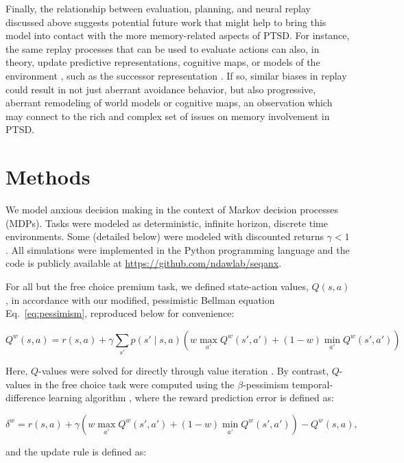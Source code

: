 \documentclass[11pt]{article} %
\begin{document}
Finally, the relationship between evaluation, planning, and neural replay discussed above suggests potential future work that might help to bring this model into contact with the more memory-related aspects of PTSD. For instance, the same replay processes that can be used to evaluate actions can also, in theory, update predictive representations, cognitive maps, or models of the environment \citep{russek_predictive_2017}, such as the successor representation \cite{dayan1993, momennejad_successor_2017}. If so, similar biases in replay could result in not just aberrant avoidance behavior, but also progressive, aberrant remodeling of world models or cognitive maps, an observation which may connect to the rich and complex set of issues on memory involvement in PTSD.

\section{Methods}

We model anxious decision making in the context of Markov decision processes (MDPs). Tasks were modeled as deterministic, infinite horizon, discrete time environments. Some (detailed below) were modeled with discounted returns $\gamma < 1$. All simulations were implemented in the Python programming language and the code is publicly available at \url{https://github.com/ndawlab/seqanx}.

For all but the free choice premium task, we defined state-action values, $Q(s,a)$, in accordance with our modified, pessimistic Bellman equation Eq.~\ref{eq:pessimism}, reproduced below for convenience:

\begin{equation*}
Q^w(s,a) = r(s,a) + \gamma \sum_{s'} p(s' \mid s,a) \left( w \max_{a'} Q^w(s',a') + (1 - w) \min_{a'} Q^w(s',a') \right)
\end{equation*}

Here, $Q$-values were solved for directly through value iteration \citep{SuttonBarto2018}. By contrast, $Q$-values in the free choice task were computed using the $\beta$-pessimism temporal-difference learning algorithm \citep{Gaskett2003}, where the reward prediction error is defined as:

\begin{equation*}
\delta^w = r(s,a) + \gamma \left( w \max_{a'} Q^w(s',a') + (1 - w) \min_{a'} Q^w(s',a') \right) - Q^w(s,a), 
\end{equation*}

and the update rule is defined as:
\end{document}

